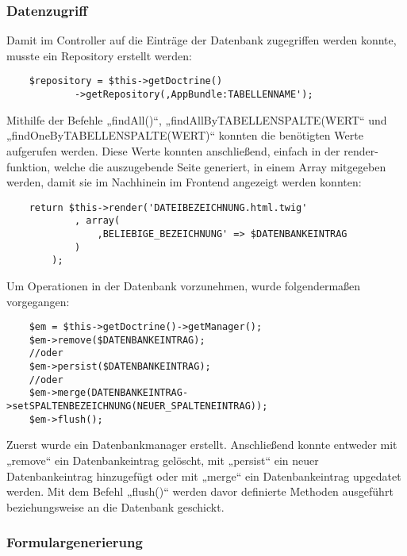    \subsubsection{Datenzugriff}

	Damit im Controller auf die Einträge der Datenbank zugegriffen werden konnte, musste ein Repository erstellt werden:
	\lstset{language = php}
  	\begin{lstlisting}
  	$repository = $this->getDoctrine()
            ->getRepository(‚AppBundle:TABELLENNAME');
  	\end{lstlisting}
	Mithilfe der Befehle „findAll()“, „findAllByTABELLENSPALTE(WERT“ und „findOneByTABELLENSPALTE(WERT)“ konnten die benötigten Werte aufgerufen werden.
	Diese Werte konnten anschließend, einfach in der render-funktion, welche die auszugebende Seite generiert, in einem Array mitgegeben werden, damit sie im Nachhinein im Frontend angezeigt werden konnten:
	\lstset{language = php}
  	\begin{lstlisting}
  	return $this->render('DATEIBEZEICHNUNG.html.twig'
            , array(
                ‚BELIEBIGE_BEZEICHNUNG' => $DATENBANKEINTRAG
            )
        );
  	\end{lstlisting}
	Um Operationen in der Datenbank vorzunehmen, wurde folgendermaßen vorgegangen:
	\lstset{language = php}
  	\begin{lstlisting}
  	$em = $this->getDoctrine()->getManager();
	$em->remove($DATENBANKEINTRAG);
	//oder
	$em->persist($DATENBANKEINTRAG);
	//oder
	$em->merge(DATENBANKEINTRAG->setSPALTENBEZEICHNUNG(NEUER_SPALTENEINTRAG));
	$em->flush();
  	\end{lstlisting}
	Zuerst wurde ein Datenbankmanager erstellt. Anschließend konnte entweder mit „remove“ ein Datenbankeintrag gelöscht, mit „persist“ ein neuer Datenbankeintrag hinzugefügt oder mit „merge“ ein Datenbankeintrag upgedatet werden. Mit dem Befehl „flush()“ werden davor definierte Methoden ausgeführt beziehungsweise an die Datenbank geschickt.

    \subsubsection{Formulargenerierung}

